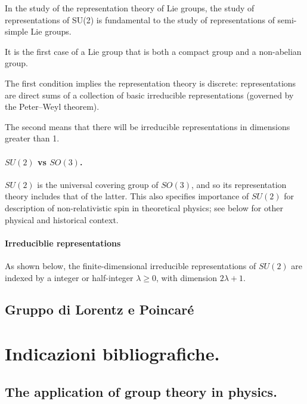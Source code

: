 \documentclass[oneside,12pt]{memoir}
\begin{document}
In the study of the representation theory of Lie groups, the study of representations of SU(2) is fundamental to the study of representations of semi-simple Lie groups.

It is the first case of a Lie group that is both a compact group and a non-abelian group.

The first condition implies the representation theory is discrete: representations are direct sums of a collection of basic irreducible representations (governed by the Peter–Weyl theorem).

The second means that there will be irreducible representations in dimensions greater than 1.

\subsection{\texorpdfstring{$SU(2)$}{SU2} vs \texorpdfstring{$SO(3)$}{SO3}.}

$SU(2)$ is the universal covering group of $SO(3)$, and so its representation theory includes that of the latter. This also specifies importance of $SU(2)$ for description of non-relativistic spin in theoretical physics; see below for other physical and historical context.

\subsection{Irreduciblie representations}

As shown below, the finite-dimensional irreducible representations of $SU(2)$ are indexed by a integer or half-integer $\lambda \geq 0$, with dimension $2\lambda+1$.



\chapter{Gruppo di Lorentz e Poincar\'e}
\PartialToc





\part{Indicazioni bibliografiche.}


\chapter{The application of group theory in physics.}
\PartialToc
\end{document}
